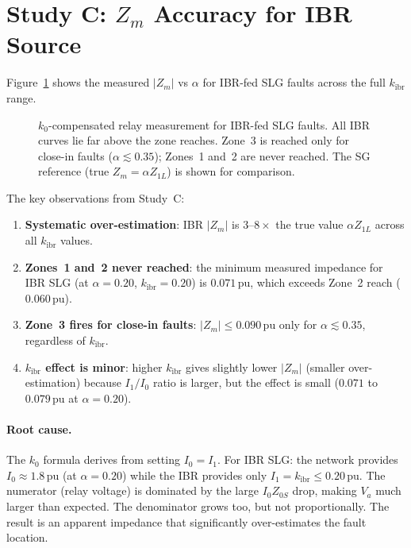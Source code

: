\documentclass[11pt,a4paper]{article}
\begin{document}
\section{Study C: $Z_m$ Accuracy for IBR Source}
\label{sec:study_c}

Figure~\ref{fig:zm_ibr} shows the measured $|Z_m|$ vs $\alpha$ for IBR-fed SLG
faults across the full $k_\mathrm{ibr}$ range.

\begin{figure}[h!]
\centering
\caption{%
  $k_0$-compensated relay measurement for IBR-fed SLG faults.  All IBR curves
  lie far above the zone reaches.  Zone~3 is reached only for close-in faults
  ($\alpha \lesssim 0.35$); Zones~1 and~2 are never reached.  The SG reference
  (true $Z_m=\alpha Z_{1L}$) is shown for comparison.}
\label{fig:zm_ibr}

\end{figure}

The key observations from Study~C:
\begin{enumerate}
  \item \textbf{Systematic over-estimation}: IBR $|Z_m|$ is $3$--$8\times$ the
        true value $\alpha Z_{1L}$ across all $k_\mathrm{ibr}$ values.
  \item \textbf{Zones~1 and~2 never reached}: the minimum measured impedance
        for IBR SLG (at $\alpha=0.20$, $k_\mathrm{ibr}=0.20$) is $0.071$\,pu,
        which exceeds Zone~2 reach ($0.060$\,pu).
  \item \textbf{Zone~3 fires for close-in faults}: $|Z_m| \leq 0.090$\,pu
        only for $\alpha \lesssim 0.35$, regardless of $k_\mathrm{ibr}$.
  \item \textbf{$k_\mathrm{ibr}$ effect is minor}: higher $k_\mathrm{ibr}$ gives
        slightly lower $|Z_m|$ (smaller over-estimation) because $I_1/I_0$
        ratio is larger, but the effect is small ($0.071$ to $0.079$\,pu at
        $\alpha=0.20$).
\end{enumerate}

\paragraph{Root cause.}
The $k_0$ formula derives from setting $I_0 = I_1$.  For IBR SLG: the network
provides $I_0 \approx 1.8$\,pu (at $\alpha=0.20$) while the IBR provides only
$I_1 = k_\mathrm{ibr} \leq 0.20$\,pu.  The numerator (relay voltage) is
dominated by the large $I_0 Z_{0S}$ drop, making $V_a$ much larger than expected.
The denominator grows too, but not proportionally.  The result is an apparent
impedance that significantly over-estimates the fault location.
\end{document}

